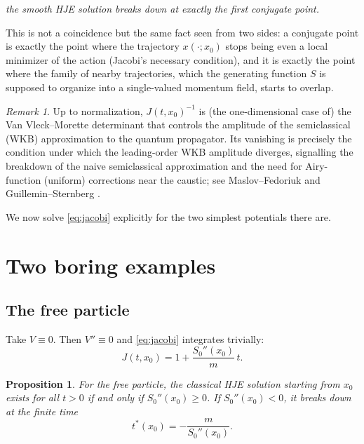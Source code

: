 \documentclass[11pt]{article}
\theoremstyle{plain}
\newtheorem{proposition}[theorem]{Proposition}
\theoremstyle{definition}
\theoremstyle{remark}
\newtheorem{remark}[theorem]{Remark}
\begin{document}
\begin{center}
\emph{the smooth HJE solution breaks down at exactly the first conjugate point.}
\end{center}

This is not a coincidence but the same fact seen from two sides: a conjugate
point is exactly the point where the trajectory $x(\cdot;x_0)$ stops being even
a local minimizer of the action (Jacobi's necessary condition), and it is
exactly the point where the family of nearby trajectories, which the generating
function $S$ is supposed to organize into a single-valued momentum field,
starts to overlap.

\begin{remark}
Up to normalization, $J(t,x_0)^{-1}$ is (the one-dimensional case of) the Van
    Vleck--Morette determinant that controls the amplitude of the semiclassical
    (WKB) approximation to the quantum propagator. Its vanishing is precisely
    the condition under which the leading-order WKB amplitude diverges,
    signalling the breakdown of the naive semiclassical approximation and the
    need for Airy-function (uniform) corrections near the caustic; see
    Maslov--Fedoriuk \cite{MaslovFedoriuk} and Guillemin--Sternberg
    \cite{GuilleminSternberg}.
\end{remark}

We now solve \eqref{eq:jacobi} explicitly for the two simplest potentials there are.

\section{Two boring examples}
\label{sec:examples}

\subsection{The free particle}
\label{sec:free}

Take $V\equiv0$. Then $V''\equiv0$ and \eqref{eq:jacobi} integrates trivially:
\begin{equation}
J(t,x_0) = 1 + \frac{S_0''(x_0)}{m}\,t.
\label{eq:Jfree}
\end{equation}

\begin{proposition}
\label{prop:free}
For the free particle, the classical HJE solution starting from $x_0$ exists
    for all $t>0$ if and only if $S_0''(x_0)\ge 0$. If $S_0''(x_0)<0$, it
    breaks down at the finite time
\[
t^\ast(x_0) = -\frac{m}{S_0''(x_0)}.
\]
\end{proposition}
\end{document}
